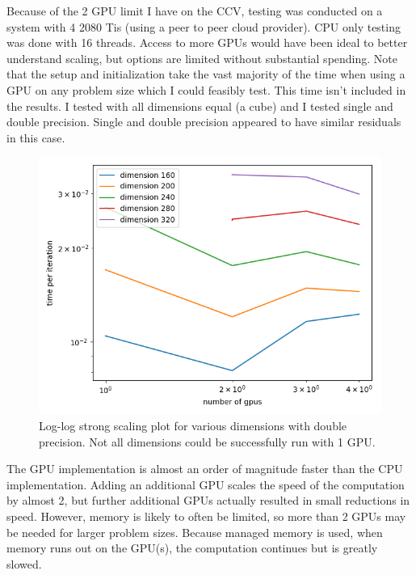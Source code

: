 \documentclass{article}
\begin{document}
Because of the 2 GPU limit I have on the CCV, testing was conducted on a system
with 4 2080 Tis (using a peer to peer cloud provider). CPU only testing was
done with 16 threads. Access to more GPUs would have been ideal to better understand
scaling, but options are limited without substantial spending.  Note that the
setup and initialization take the vast majority of the time when using a GPU on
any problem size which I could feasibly test. This time isn't included in the
results. I tested with all dimensions equal (a cube) and I tested single and
double precision.  Single and double precision appeared to have similar
residuals in this case. \\

\begin{figure}[h] 
  \centering
  \includegraphics[width=0.8\linewidth]{../strong_scaling.png}
  \caption{Log-log strong scaling plot for various dimensions with double 
    precision.  Not all dimensions could be successfully run with 1 GPU.}
\end{figure}


The GPU implementation is almost an order of magnitude faster than the CPU
implementation. Adding an additional GPU scales the speed of the computation by
almost 2, but further additional GPUs actually resulted in small reductions in
speed. However, memory is likely to often be limited, so more than 2 GPUs may
be needed for larger problem sizes. Because managed memory is used, when memory
runs out on the GPU(s), the computation continues but is greatly slowed. \\
\end{document}
